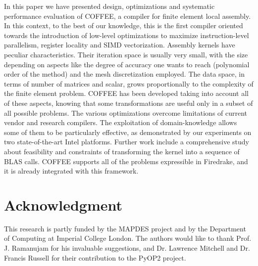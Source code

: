 \documentclass[conference]{IEEEtran}
\begin{document}
In this paper we have presented design, optimizations and systematic performance evaluation of COFFEE, a compiler for finite element local assembly. In this context, to the best of our knowledge, this is the first compiler oriented towards the introduction of low-level optimizations to maximize instruction-level parallelism, register locality and SIMD vectorization. Assembly kernels have peculiar characteristics. Their iteration space is usually very small, with the size depending on aspects like the degree of accuracy one wants to reach (polynomial order of the method) and the mesh discretization employed. The data space, in terms of number of matrices and scalar, grows proportionally to the complexity of the finite element problem. COFFEE has been developed taking into account all of these aspects, knowing that some transformations are useful only in a subset of all possible problems. The various optimizations overcome limitations of current vendor and research compilers. The exploitation of domain-knowledge allows some of them to be particularly effective, as demonstrated by our experiments on two state-of-the-art Intel platforms. Further work include a comprehensive study about feasibility and constraints of transforming the kernel into a sequence of BLAS calls. COFFEE supports all of the problems expressible in Firedrake, and it is already integrated with this framework. 



\section*{Acknowledgment}

This research is partly funded by the MAPDES project and by the Department of Computing at Imperial College London. The authors would like to thank Prof. J. Ramanujam for his invaluable suggestions, and Dr. Lawrence Mitchell and Dr. Francis Russell for their contribution to the PyOP2 project.
\end{document}
